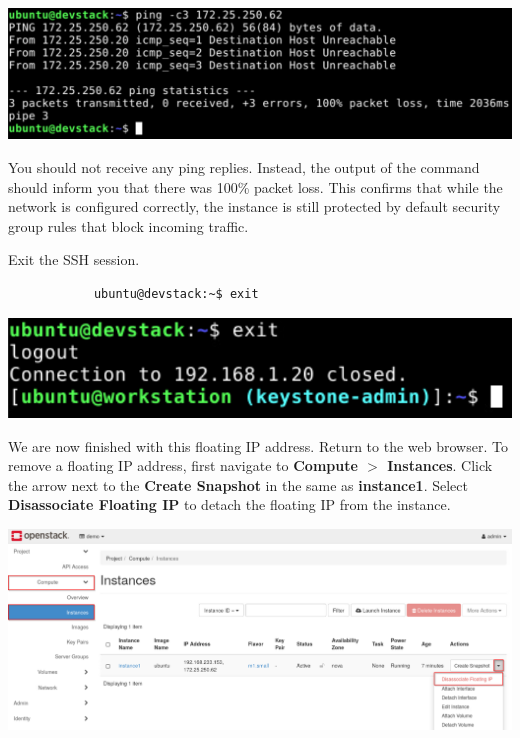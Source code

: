 \documentclass[letterpaper, 12pt]{article}
\begin{document}
\begin{enumerate}
\begin{labstep}
        \begin{center}
            \includegraphics[width=\linewidth]{images/part3/step9.png}
        \end{center}
    \end{labstep}

    \begin{notebox}
        You should not receive any ping replies.
        Instead, the output of the command should inform you that there was 100\% packet loss.
        This confirms that while the network is configured correctly, the instance is still protected by default security group rules that block incoming traffic.
    \end{notebox}

    \begin{labstep}
        Exit the SSH session.
        \begin{lstlisting}
            ubuntu@devstack:~$ exit
        \end{lstlisting}

        \begin{center}
            \includegraphics[width=\linewidth]{images/part3/step10.png}
        \end{center}
    \end{labstep}

    \begin{labstep}
        We are now finished with this floating IP address.
        Return to the web browser.
        To remove a floating IP address, first navigate to \textbf{Compute $>$ Instances}.
        Click the arrow next to the \textbf{Create Snapshot} in the same as \textbf{instance1}.
        Select \textbf{Disassociate Floating IP} to detach the floating IP from the instance.

        \begin{center}
            \includegraphics[width=\linewidth]{images/part3/step11.png}
        \end{center}
    \end{labstep}


\end{enumerate}
\end{document}
